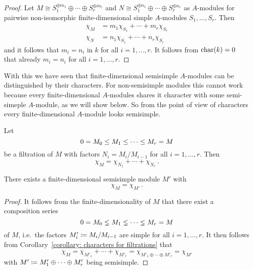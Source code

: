 \begin{proof}
  Let $M \cong S_1^{\oplus m_1} \oplus \dotsb \oplus S_r^{\oplus m_r}$ and $N \cong S_1^{\oplus n_1} \oplus \dotsb \oplus S_r^{\oplus n_r}$ as $A$-modules for pairwise non-isomorphic finite-dimensional simple $A$-modules $S_1, \dotsc, S_r$.
  Then
  \begin{align*}
    \chi_M &= m_1 \chi_{S_1} + \dotsb + m_r \chi_{S_r}  \\
    \chi_N &= n_1 \chi_{S_1} + \dotsb + n_r \chi_{S_r}
  \end{align*}
  and it follows that $m_i = n_i$ in $k$ for all $i = 1, \dotsc, r$.
  It follows from $\operatorname{char}(k) = 0$ that already $m_i = n_i$ for all $i = 1, \dotsc, r$.
\end{proof}


\begin{fluff}
  With this we have seen that finite-dimensional semisimple $A$-modules can be distinguished by their characters.
  For non-semisimple modules this cannot work because every finite-dimensional $A$-modules shares it character with some semi-simeple $A$-module, as we will show below.
  So from the point of view of characters every finite-dimensional $A$-module looks semisimple.
\end{fluff}


\begin{corollary}
  \label{corollary: characters for filtrations}
  Let
  \[
                0
    =           M_0
    \leq  M_1
    \leq  \dotsb
    \leq  M_r
    =           M
  \]
  be a filtration of $M$ with factors $N_i = M_i/M_{i-1}$ for all $i = 1, \dotsc, r$.
  Then
  \[
      \chi_M
    = \chi_{N_1} + \dotsb + \chi_{N_r} \,.
  \]
\end{corollary}


\begin{corollary}
  There exists a finite-dimensional semisimple module $M'$ with
  \[
    \chi_M = \chi_{M'} \,.
  \]
\end{corollary}


\begin{proof}
  It follows from the finite-dimensionality of $M$ that there exist a composition series
  \[
                  0
    =             M_0
    \lneq   M_1
    \lneq   \dotsb
    \lneq   M_r
    =             M
  \]
  of $M$, i.e.\ the factors $M'_i \coloneqq M_i/M_{i-1}$ are simple for all $i = 1, \dotsc, r$.
  It then follows from Corollary~\ref{corollary: characters for filtrations} that
  \[
      \chi_M
    = \chi_{M'_1} + \dotsb + \chi_{M'_r}
    = \chi_{M'_1 \oplus \dotsb \oplus M'_r}
    = \chi_{M'}
  \]
  with $M' \coloneqq M'_1 \oplus \dotsb \oplus M'_r$ being semisimple.
\end{proof}





